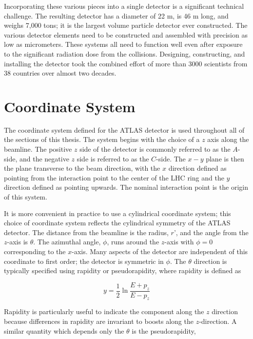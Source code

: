 Incorporating these various pieces into a single detector is a significant technical challenge.
The resulting detector has a diameter of 22 m, is 46 m long, and weighs 7,000 tons; it is the largest volume particle detector ever constructed.
The various detector elements need to be constructed and assembled with precision as low as micrometers.
These systems all need to function well even after exposure to the significant radiation dose from the collisions.
Designing, constructing, and installing the detector took the combined effort of more than 3000 scientists from 38 countries over almost two decades.


\section{Coordinate System}

The coordinate system defined for the ATLAS detector is used throughout all of the sections of this thesis.
The system begins with the choice of a $z$ axis along the beamline.
The positive $z$ side of the detector is commonly referred to as the $A$-side, and the negative $z$ side is referred to as the $C$-side.
The $x-y$ plane is then the plane transverse to the beam direction, with the $x$ direction defined as pointing from the interaction point to the center of the \ac{LHC} ring and the $y$ direction defined as pointing upwards.
The nominal interaction point is the origin of this system.

It is more convenient in practice to use a cylindrical coordinate system; this choice of coordinate system reflects the cylindrical symmetry of the ATLAS detector.
The distance from the beamline is the radius, $r$', and the angle from the $z$-axis is $\theta$.
The azimuthal angle, $\phi$, runs around the $z$-axis with $\phi = 0$ corresponding to the $x$-axis.
Many aspects of the detector are independent of this coordinate to first order; the detector is symmetric in $\phi$.
The $\theta$ direction is typically specified using rapidity or pseudorapidity, where rapidity is defined as

\begin{equation}\label{eq:rapidity}
y = \frac{1}{2} \ln \frac{E + p_z}{E - p_z}
\end{equation}

\noindent Rapidity is particularly useful to indicate the component along the $z$ direction because differences in rapidity are invariant to boosts along the $z$-direction.
A similar quantity which depends only the $\theta$ is the pseudorapidity, 

